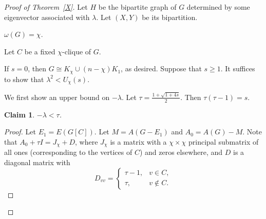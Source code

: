 \documentclass[12pt]{article}
\newtheorem{claim}{Claim}[section]
\begin{document}
\begin{proof}[Proof of Theorem~\ref{X}]
 

Let $H$ be the bipartite graph of $G$ determined by some eigenvector associated with $\lambda$. Let $(X,Y)$ be its bipartition.

 $\omega(G)=\chi$.



Let $C$ be a fixed $\chi$-clique of $G$.

If $s=0$, then $G\cong K_\chi\cup (n-\chi) K_1$, as desired. Suppose that $s\ge 1$.   
It suffices to show that $\lambda^2 <U_\chi(s)$.

We first show an upper bound on $-\lambda$. Let $\tau = \frac{1+\sqrt{1+4s}}{2}$. Then $\tau(\tau-1)=s$.
\begin{claim}\label{c1}
$-\lambda< \tau$. %
\end{claim}
\begin{proof}
Let $E_1=E(G[C])$. Let $M=A(G-E_1)$ and $A_0=A(G)-M$. 
Note that $A_0 + \tau I = J_\chi + D$, where $J_\chi$ is a matrix with a $\chi\times \chi$ principal submatrix of all  ones (corresponding to the vertices of $C$) and zeros elsewhere, and $D$ is a diagonal matrix with \[
D_{vv}=\begin{cases}
\tau-1, & v\in C,\\
\tau, & v\notin C.
\end{cases}
\]


\end{proof}
\end{proof}
\end{document}
